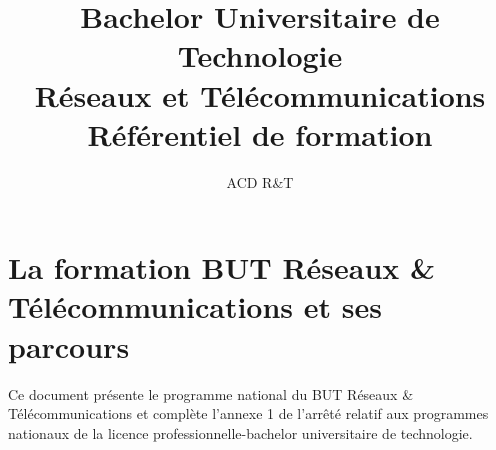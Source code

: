 \documentclass[10pt,lualatex,french]{article}
\title{Bachelor Universitaire de Technologie\\
Réseaux et Télécommunications\\
Référentiel de formation}
\author{ACD R\&T}%
\begin{document}
\setmainfont{Arial}
\renewcommand{\labelitemi}{$\bullet$}
\renewcommand{\labelitemii}{$\circ$}
\pagestyle{BO}


\thispagestyle{empty}



\clearpage

	



\section{La formation BUT Réseaux \& Télécommunications et ses parcours}
{
    \setlength{\parindent}{0cm}
    \setlength{\parskip}{1ex}


\bigskip
Ce document présente le programme national du BUT Réseaux \& Télécommunications et complète l'annexe 1 de l’arrêté relatif aux programmes nationaux de la licence professionnelle-bachelor universitaire de technologie.
}












\end{document}
